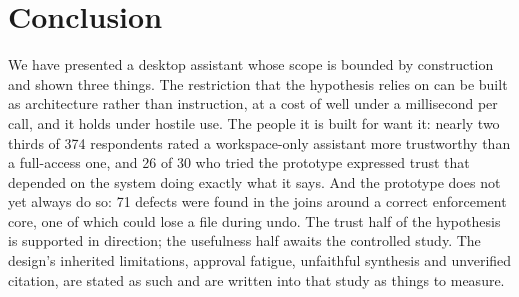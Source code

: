 \section{Conclusion}
\label{sec:conclusion}

We have presented a desktop assistant whose scope is bounded by construction and shown three things. The restriction that the hypothesis relies on can be built as architecture rather than instruction, at a cost of well under a millisecond per call, and it holds under hostile use. The people it is built for want it: nearly two thirds of 374 respondents rated a workspace-only assistant more trustworthy than a full-access one, and 26 of 30 who tried the prototype expressed trust that depended on the system doing exactly what it says. And the prototype does not yet always do so: 71 defects were found in the joins around a correct enforcement core, one of which could lose a file during undo. The trust half of the hypothesis is supported in direction; the usefulness half awaits the controlled study. The design's inherited limitations, approval fatigue, unfaithful synthesis and unverified citation, are stated as such and are written into that study as things to measure.

